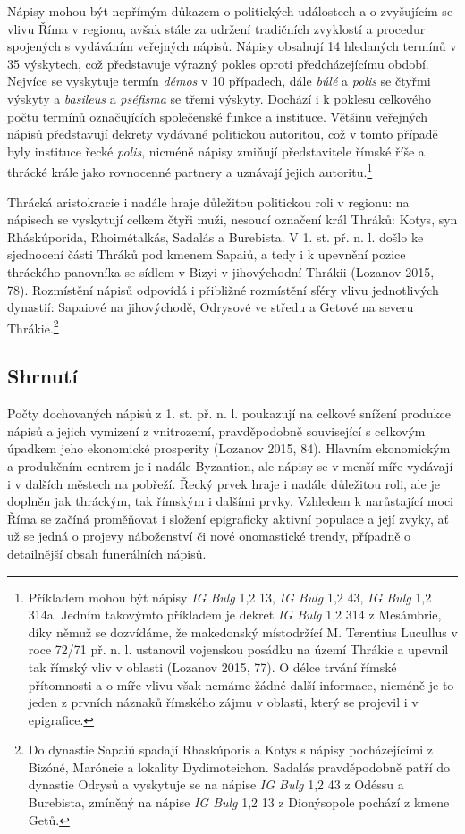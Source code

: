 Nápisy mohou být nepřímým důkazem o politických událostech a o zvyšujícím se vlivu Říma v regionu, avšak stále za udržení tradičních zvyklostí a procedur spojených s vydáváním veřejných nápisů. Nápisy obsahují 14 hledaných termínů v 35 výskytech, což představuje výrazný pokles oproti předcházejícímu období. Nejvíce se vyskytuje termín {\em démos} v 10 případech, dále {\em búlé} a {\em polis} se čtyřmi výskyty a {\em basileus} a {\em pséfisma} se třemi výskyty. Dochází i k poklesu celkového počtu termínů označujících společenské funkce a instituce. Většinu veřejných nápisů představují dekrety vydávané politickou autoritou, což v tomto případě byly instituce řecké {\em polis}, nicméně nápisy zmiňují představitele římské říše a thrácké krále jako rovnocenné partnery a uznávají jejich autoritu.\footnote{Příkladem mohou být nápisy {\em IG Bulg} 1,2 13, {\em IG Bulg} 1,2 43, {\em IG Bulg} 1,2 314a. Jedním takovýmto příkladem je dekret {\em IG Bulg} 1,2 314 z Mesámbrie, díky němuž se dozvídáme, že makedonský místodržící M. Terentius Lucullus v roce 72/71 př. n. l. ustanovil vojenskou posádku na území Thrákie a upevnil tak římský vliv v oblasti (Lozanov 2015, 77). O délce trvání římské přítomnosti a o míře vlivu však nemáme žádné další informace, nicméně je to jeden z prvních náznaků římského zájmu v oblasti, který se projevil i v epigrafice.}

Thrácká aristokracie i nadále hraje důležitou politickou roli v regionu: na nápisech se vyskytují celkem čtyři muži, nesoucí označení král Thráků: Kotys, syn Rháskúporida, Rhoimétalkás, Sadalás a Burebista. V 1. st. př. n. l. došlo ke sjednocení části Thráků pod kmenem Sapaiů, a tedy i k upevnění pozice thráckého panovníka se sídlem v Bizyi v jihovýchodní Thrákii (Lozanov 2015, 78). Rozmístění nápisů odpovídá i přibližné rozmístění sféry vlivu jednotlivých dynastií: Sapaiové na jihovýchodě, Odrysové ve středu a Getové na severu Thrákie.\footnote{Do dynastie Sapaiů spadají Rhaskúporis a Kotys s nápisy pocházejícími z Bizóné, Maróneie a lokality Dydimoteichon. Sadalás pravděpodobně patří do dynastie Odrysů a vyskytuje se na nápise {\em IG Bulg} 1,2 43 z Odéssu a Burebista, zmíněný na nápise {\em IG Bulg} 1,2 13 z Dionýsopole pochází z kmene Getů.}

\subsection[shrnutí-13]{Shrnutí}

Počty dochovaných nápisů z 1. st. př. n. l. poukazují na celkové snížení produkce nápisů a jejich vymizení z vnitrozemí, pravděpodobně související s celkovým úpadkem jeho ekonomické prosperity (Lozanov 2015, 84). Hlavním ekonomickým a produkčním centrem je i nadále Byzantion, ale nápisy se v menší míře vydávají i v dalších městech na pobřeží. Řecký prvek hraje i nadále důležitou roli, ale je doplněn jak thráckým, tak římským i dalšími prvky. Vzhledem k narůstající moci Říma se začíná proměňovat i složení epigraficky aktivní populace a její zvyky, ať už se jedná o projevy náboženství či nové onomastické trendy, případně o detailnější obsah funerálních nápisů.

